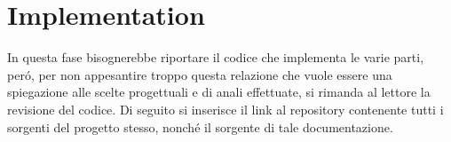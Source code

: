 \section{Implementation}

In questa fase bisognerebbe riportare il codice che implementa le varie parti, per\'o, per non appesantire troppo questa relazione che vuole essere una spiegazione alle scelte progettuali e di anali effettuate, si rimanda al lettore la revisione del codice. Di seguito si inserisce il link al repository contenente tutti i sorgenti del progetto stesso, nonch\'e il sorgente di tale documentazione.

